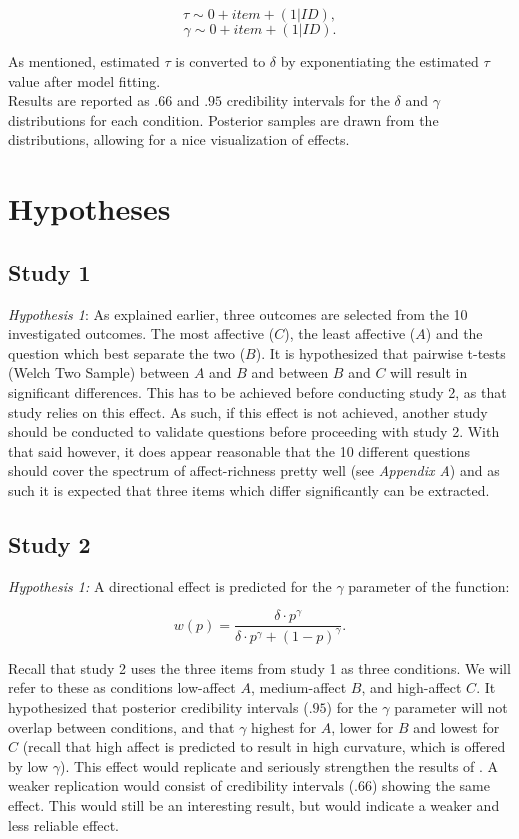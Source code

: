 \documentclass[12pt]{article}
\begin{document}
 \[
	 \tau \sim 0 + item + (1|ID),
\]
\[
	\gamma \sim 0 + item + (1|ID)
.\]

As mentioned, estimated $\tau$ is converted
to $\delta$ by exponentiating the estimated
$\tau$ value after model fitting. \\

Results are reported as $.66$ and $.95$
credibility intervals
for the $\delta$ and $\gamma$ distributions
for each condition. Posterior samples
are drawn from the distributions, allowing
for a nice visualization of effects.

\section{Hypotheses}

\subsection{Study 1}
\emph{Hypothesis 1}: As explained earlier,
three outcomes are selected from the
10 investigated outcomes. The most
affective ($C$), the least affective ($A$) and the
question which best separate the two ($B$).
It is hypothesized that pairwise t-tests (Welch
Two Sample)
between $A$ and  $B$ and between  $B$ and  $C$
will result in significant differences.
This has to be achieved before conducting
study 2, as that study relies on this effect.
As such, if this effect is not achieved, another
study should be conducted to validate questions
before proceeding with study 2. With that said
however, it does appear reasonable that
the 10 different questions should cover the
spectrum of affect-richness pretty well
(see \emph{Appendix A}) and as such it is
expected that three items which differ significantly
can be extracted.

\subsection{Study 2}
\emph{Hypothesis 1:} A directional effect is
predicted for the $\gamma$ parameter of the function:

\[
	w(p) = \frac{\delta \cdot p^{\gamma}}
	{\delta \cdot p^{\gamma}+(1-p)^{\gamma}}
.\]

Recall that study 2 uses the three
items from study 1 as three conditions.
We will refer to these as conditions
low-affect $A$, medium-affect $B$, and
high-affect $C$. It hypothesized that
posterior credibility intervals ($.95$)
for the $\gamma$
parameter will not overlap between
conditions, and that $\gamma$ highest for
$A$, lower for  $B$ and lowest for  $C$
(recall that high affect is predicted to
result in high curvature, which is offered
by low $\gamma$). This effect would replicate
and seriously strengthen the results of
\textcite{rottenstreich2001money}. A
weaker replication would consist of
credibility intervals ($.66$) showing the
same effect. This would still be an
interesting result, but would indicate a
weaker and less reliable effect. \\
\end{document}
